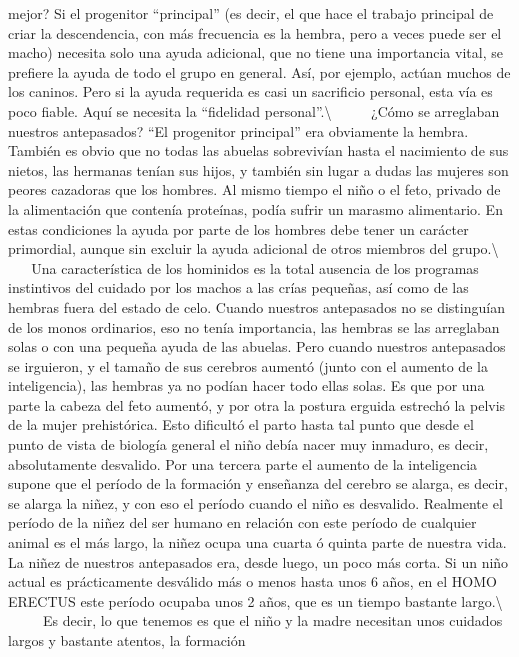 mejor? Si el progenitor ``principal'' (es decir, el que hace el trabajo
principal de criar la descendencia, con más frecuencia es la hembra,
pero a veces puede ser el macho) necesita solo una ayuda adicional, que
no tiene una importancia vital, se prefiere la ayuda de todo el grupo en
general. Así, por ejemplo, actúan muchos de los caninos. Pero si la
ayuda requerida es casi un sacrificio personal, esta vía es poco fiable.
Aquí se necesita la ``fidelidad personal''.\textbackslash{} ~ ~ ~ ¿Cómo
se arreglaban nuestros antepasados? ``El progenitor principal'' era
obviamente la hembra. También es obvio que no todas las abuelas
sobrevivían hasta el nacimiento de sus nietos, las hermanas tenían sus
hijos, y también sin lugar a dudas las mujeres son peores cazadoras que
los hombres. Al mismo tiempo el niño o el feto, privado de la
alimentación que contenía proteínas, podía sufrir un marasmo
alimentario. En estas condiciones la ayuda por parte de los hombres debe
tener un carácter primordial, aunque sin excluir la ayuda adicional de
otros miembros del grupo.\textbackslash{} ~ ~ ~ Una característica de
los hominidos es la total ausencia de los programas instintivos del
cuidado por los machos a las crías pequeñas, así como de las hembras
fuera del estado de celo. Cuando nuestros antepasados no se distinguían
de los monos ordinarios, eso no tenía importancia, las hembras se las
arreglaban solas o con una pequeña ayuda de las abuelas. Pero cuando
nuestros antepasados se irguieron, y el tamaño de sus cerebros aumentó
(junto con el aumento de la inteligencia), las hembras ya no podían
hacer todo ellas solas. Es que por una parte la cabeza del feto aumentó,
y por otra la postura erguida estrechó la pelvis de la mujer
prehistórica. Esto dificultó el parto hasta tal punto que desde el punto
de vista de biología general el niño debía nacer muy inmaduro, es decir,
absolutamente desvalido. Por una tercera parte el aumento de la
inteligencia supone que el período de la formación y enseñanza del
cerebro se alarga, es decir, se alarga la niñez, y con eso el período
cuando el niño es desvalido. Realmente el período de la niñez del ser
humano en relación con este período de cualquier animal es el más largo,
la niñez ocupa una cuarta ó quinta parte de nuestra vida. La niñez de
nuestros antepasados era, desde luego, un poco más corta. Si un niño
actual es prácticamente desválido más o menos hasta unos 6 años, en el
HOMO ERECTUS este período ocupaba unos 2 años, que es un tiempo bastante
largo.\textbackslash{} ~ ~ ~ Es decir, lo que tenemos es que el niño y
la madre necesitan unos cuidados largos y bastante atentos, la formación
